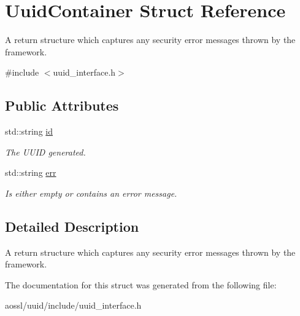 \hypertarget{structUuidContainer}{}\section{Uuid\+Container Struct Reference}
\label{structUuidContainer}


A return structure which captures any security error messages thrown by the framework.  




{\ttfamily \#include $<$uuid\+\_\+interface.\+h$>$}

\subsection*{Public Attributes}
\begin{DoxyCompactItemize}
\item 
std\+::string \hyperlink{structUuidContainer_aea2f6e3768858acb4086cd1a93c5666a}{id}\hypertarget{structUuidContainer_aea2f6e3768858acb4086cd1a93c5666a}{}\label{structUuidContainer_aea2f6e3768858acb4086cd1a93c5666a}

\begin{DoxyCompactList}\small\item\em The U\+U\+ID generated. \end{DoxyCompactList}\item 
std\+::string \hyperlink{structUuidContainer_a58e21d1df4638157e157a41fa95a5e07}{err}\hypertarget{structUuidContainer_a58e21d1df4638157e157a41fa95a5e07}{}\label{structUuidContainer_a58e21d1df4638157e157a41fa95a5e07}

\begin{DoxyCompactList}\small\item\em Is either empty or contains an error message. \end{DoxyCompactList}\end{DoxyCompactItemize}


\subsection{Detailed Description}
A return structure which captures any security error messages thrown by the framework. 

The documentation for this struct was generated from the following file\+:\begin{DoxyCompactItemize}
\item 
aossl/uuid/include/uuid\+\_\+interface.\+h\end{DoxyCompactItemize}
